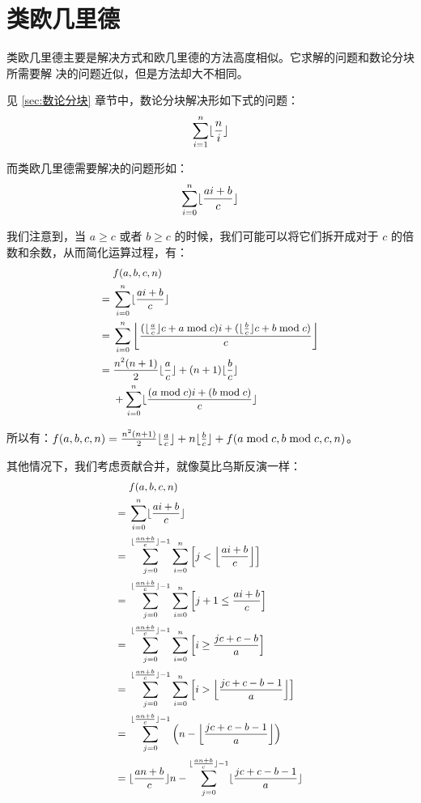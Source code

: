 \section{类欧几里德} \label{sec:类欧几里德}
类欧几里德主要是解决方式和欧几里德的方法高度相似。它求解的问题和数论分块所需要解
决的问题近似，但是方法却大不相同。

见 \ref{sec:数论分块} 章节中，数论分块解决形如下式的问题：
$$
\sum^{n}_{i=1} \lfloor{n \over i}\rfloor
$$

而类欧几里德需要解决的问题形如：
$$
\sum^{n}_{i=0} \lfloor{ai + b \over c}\rfloor
$$

我们注意到，当 $a \ge c$ 或者 $b \ge c$ 的时候，我们可能可以将它们拆开成对于 $c$
的倍数和余数，从而简化运算过程，有：
$$
\small
\begin{aligned}
    {} & f(a, b, c, n) \\
    = {} & \sum^{n}_{i=0} \lfloor{ai + b \over c}\rfloor \\
    = {} & \sum^{n}_{i=0} \left\lfloor{(\lfloor{a \over c}\rfloor c + a \bmod c)i +
        (\lfloor{b \over c}\rfloor c + b \bmod c) \over c}\right\rfloor \\
    = {} &{n^2 (n + 1) \over 2} \lfloor{a \over c}\rfloor + (n + 1) \lfloor{b \over c}\rfloor \\ 
    {} & + \sum^{n}_{i=0} \lfloor{(a \bmod c) i + (b \bmod c) \over c}\rfloor
\end{aligned}
$$

所以有：$f(a, b, c, n) = {n^2 (n + 1) \over 2} \lfloor{a \over c}\rfloor + n
\lfloor{b \over c}\rfloor  + f(a \bmod c, b \bmod c, c, n)$。

其他情况下，我们考虑贡献合并，就像莫比乌斯反演一样：
$$
\small
\begin{aligned}
    {} & f(a, b, c, n) \\
    = {} & \sum^{n}_{i=0} \lfloor{ai + b \over c}\rfloor \\
    = {} & \sum^{\lfloor{an + b \over c}\rfloor - 1}_{j=0} \sum_{i=0}^{n} \left[j <
        \left\lfloor{ai + b \over c}\right\rfloor\right] \\
    = {} & \sum^{\lfloor{an + b \over c}\rfloor - 1}_{j=0} \sum_{i=0}^{n} \left[
        j + 1 \le {ai + b \over c}\right] \\
    = {} & \sum^{\lfloor{an + b \over c}\rfloor - 1}_{j=0} \sum_{i=0}^{n}
        \left[i \ge {jc + c - b \over a}\right] \\
    = {} & \sum^{\lfloor{an + b \over c}\rfloor - 1}_{j=0} \sum_{i=0}^{n}
        \left[i > \left\lfloor{jc + c - b - 1 \over a}\right\rfloor\right] \\
    = {} & \sum^{\lfloor{an + b \over c}\rfloor - 1}_{j=0} \left(n - \left\lfloor{jc
        + c - b - 1 \over a}\right\rfloor\right) \\
    = {} & \lfloor{an + b \over c}\rfloor n - \sum^{\lfloor{an+b\over
        c}\rfloor-1}_{j=0} \lfloor{jc + c -  b - 1 \over a}\rfloor
\end{aligned}
$$

